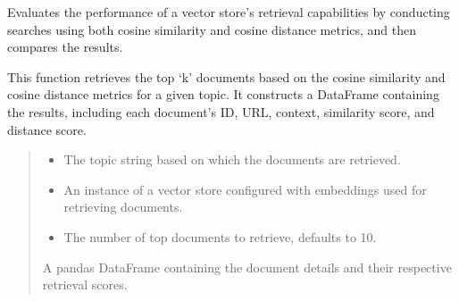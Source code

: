 \documentclass[letterpaper,10pt,english,openany,oneside]{sphinxmanual}
\begin{document}
\begin{fulllineitems}
\label{\detokenize{evaluation:tools.pipeline.evaluate_retriever}}
\pysigstartsignatures
{}
\pysigstopsignatures
\sphinxAtStartPar
Evaluates the performance of a vector store’s retrieval capabilities by conducting searches using
both cosine similarity and cosine distance metrics, and then compares the results.

\sphinxAtStartPar
This function retrieves the top ‘k’ documents based on the cosine similarity and cosine distance
metrics for a given topic. It constructs a DataFrame containing the results, including each
document’s ID, URL, context, similarity score, and distance score.
\begin{quote}\begin{description}
\begin{itemize}
\item {} 
\sphinxAtStartPar
{} \textendash{} The topic string based on which the documents are retrieved.

\item {} 
\sphinxAtStartPar
{} \textendash{} An instance of a vector store configured with embeddings used for retrieving documents.

\item {} 
\sphinxAtStartPar
{} \textendash{} The number of top documents to retrieve, defaults to 10.

\end{itemize}

\sphinxAtStartPar
A pandas DataFrame containing the document details and their respective retrieval scores.

\end{description}\end{quote}

\end{fulllineitems}
\end{document}

